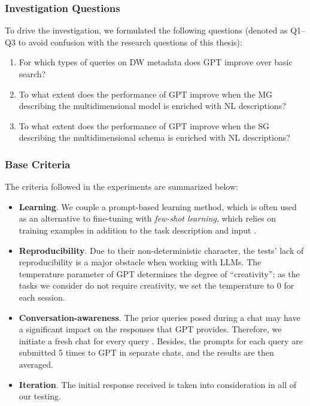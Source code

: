\subsubsection{Investigation Questions}
\label{sec:llm-rqs}

To drive the investigation, we formulated the following questions (denoted as Q1--Q3 to avoid confusion with the research questions of this thesis):
\begin{enumerate}[leftmargin=31pt,label=Q{\arabic*}:]
    \item For which types of queries on DW metadata does GPT improve over basic search?
    \item To what extent does the performance of GPT improve when the MG describing the multidimensional model is enriched with NL descriptions?
    \item To what extent does the performance of GPT improve when the SG describing the multidimensional schema is enriched with NL descriptions?
\end{enumerate}

\subsubsection{Base Criteria}
The criteria followed in the experiments are summarized below:
\begin{itemize}
    \item \textbf{Learning}.
    We couple a prompt-based learning method, which is often used as an alternative to fine-tuning \cite{DBLP:conf/models/ChenYCLMV23} with \emph{few-shot learning}, which relies on training examples in addition to the task description and input \cite{DBLP:conf/nips/BrownMRSKDNSSAA20}.

    \item \textbf{Reproducibility}. Due to their non-deterministic character, the tests' lack of reproducibility is a major obstacle when working with LLMs. The temperature parameter of GPT determines the degree of ``creativity''; as the tasks we consider do not require creativity, we set the temperature to 0 for each session.

    \item \textbf{Conversation-awareness}. The prior queries posed during a chat may have a significant impact on the responses that GPT provides. Therefore, we initiate a fresh chat for every query \cite{DBLP:journals/sosym/CamaraTBV23}. Besides, the prompts for each query are submitted 5 times to GPT in separate chats, and the results are then averaged.

    \item \textbf{Iteration}. The initial response received is taken into consideration in all of our testing.
\end{itemize}

